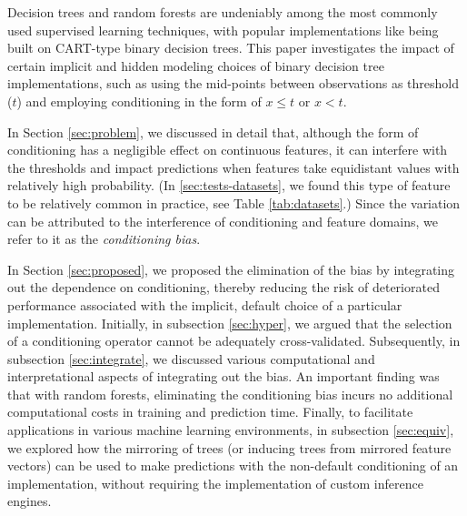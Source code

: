 \documentclass[sn-mathphys]{sn-jnl}%
\theoremstyle{thmstyleone}%
\theoremstyle{thmstyletwo}%
\theoremstyle{thmstylethree}%
\begin{document}
Decision trees and random forests are undeniably among the most commonly used supervised learning techniques, with popular implementations like \citep{sklearn, tree} being built on CART-type binary decision trees. This paper investigates the impact of certain implicit and hidden modeling choices of binary decision tree implementations, such as using the mid-points between observations as threshold ($t$) and employing conditioning in the form of $x\leq t$ or $x < t$.

In Section \ref{sec:problem}, we discussed in detail that, although the form of conditioning has a negligible effect on continuous features, it can interfere with the thresholds and impact predictions when features take equidistant values with relatively high probability. (In \ref{sec:tests-datasets}, we found this type of feature to be relatively common in practice, see Table \ref{tab:datasets}.) Since the variation can be attributed to the interference of conditioning and feature domains, we refer to it as the \emph{conditioning bias}.

In Section \ref{sec:proposed}, we proposed the elimination of the bias by integrating out the dependence on conditioning, thereby reducing the risk of deteriorated performance associated with the implicit, default choice of a particular implementation. Initially, in subsection \ref{sec:hyper}, we argued that the selection of a conditioning operator cannot be adequately cross-validated. Subsequently, in subsection \ref{sec:integrate}, we discussed various computational and interpretational aspects of integrating out the bias. An important finding was that with random forests, eliminating the conditioning bias incurs no additional computational costs in training and prediction time. Finally, to facilitate applications in various machine learning environments, in subsection \ref{sec:equiv}, we explored how the mirroring of trees (or inducing trees from mirrored feature vectors) can be used to make predictions with the non-default conditioning of an implementation, without requiring the implementation of custom inference engines.
\end{document}
